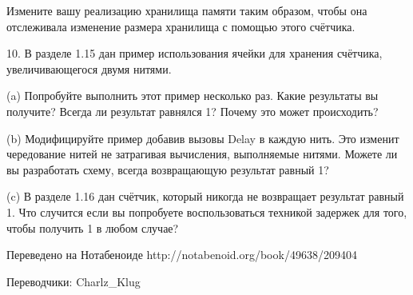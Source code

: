 Измените вашу реализацию хранилища памяти таким образом, чтобы она отслеживала изменение размера хранилища с помощью этого счётчика.

10. В разделе 1.15 дан пример использования ячейки для хранения счётчика, увеличивающегося двумя нитями.

(a) Попробуйте выполнить этот пример несколько раз. Какие результаты вы получите? Всегда ли результат равнялся 1? Почему это может происходить?

(b) Модифицируйте пример добавив вызовы Delay в каждую нить. Это изменит чередование нитей не затрагивая вычисления, выполняемые нитями. Можете ли вы разработать схему, всегда возвращающую результат равный 1?

(c) В разделе 1.16 дан счётчик, который никогда не возвращает результат равный 1. Что случится если вы попробуете воспользоваться техникой задержек для того, чтобы получить 1 в любом случае?

Переведено на Нотабеноиде
http://notabenoid.org/book/49638/209404

Переводчики: Charlz\_Klug


